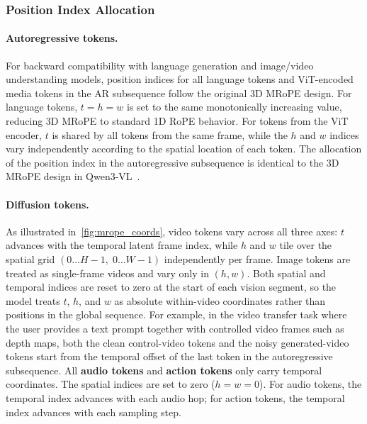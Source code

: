 \subsubsection{Position Index Allocation}
\paragraph{Autoregressive tokens.} For backward compatibility with language generation and image/video understanding models, position indices for all language tokens and ViT-encoded media tokens in the AR subsequence follow the original 3D MRoPE design. For language tokens, $t = h = w$ is set to the same monotonically increasing value, reducing 3D MRoPE to standard 1D RoPE behavior. For tokens from the ViT encoder, $t$ is shared by all tokens from the same frame, while the $h$ and $w$ indices vary independently according to the spatial location of each token. The allocation of the position index in the autoregressive subsequence is identical to the 3D MRoPE design in Qwen3-VL~\citep{bai2025qwen3}.



\paragraph{Diffusion tokens.} As illustrated in~\cref{fig:mrope_coords}, video tokens vary across all three axes: $t$ advances with the temporal latent frame index, while $h$ and $w$ tile over the spatial grid $(0 \ldots H{-}1,\; 0 \ldots W{-}1)$ independently per frame. Image tokens are treated as single-frame videos and vary only in $(h, w)$. Both spatial and temporal indices are reset to zero at the start of each vision segment, so the model treats $t$, $h$, and $w$ as absolute within-video coordinates rather than positions in the global sequence. For example, in the video transfer task where the user provides a text prompt together with controlled video frames such as depth maps, both the clean control-video tokens and the noisy generated-video tokens start from the temporal offset of the last token in the autoregressive subsequence. All \textbf{audio tokens} and \textbf{action tokens} only carry temporal coordinates. The spatial indices are set to zero ($h = w = 0$). For audio tokens, the temporal index advances with each audio hop; for action tokens, the temporal index advances with each sampling step.

